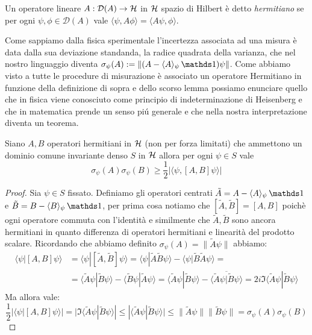 \begin{definition}
    Un operatore lineare $A : \mathcal{D}(A)\to \operatorname{\mathcal{H}}$ in $\operatorname{\mathcal{H}}$ spazio di Hilbert è detto \emph{hermitiano} se per ogni $\psi, \phi \in \mathcal{D}(A)$ vale $\langle \psi, A \phi \rangle = \langle A \psi, \phi \rangle$.
\end{definition}
Come sappiamo dalla fisica sperimentale l'incertezza associata ad una misura è data dalla sua deviazione standanda, la radice quadrata della varianza, che nel nostro linguaggio diventa $\sigma_\psi(A):= \| (A - \langle A \rangle_\psi \un) \psi \|$. Come abbiamo visto a tutte le procedure di misurazione è associato un operatore Hermitiano in funzione della definizione di sopra e dello scorso lemma possiamo enunciare quello che in fisica viene conosciuto come principio di indeterminazione di Heisenberg e che in matematica prende un senso piú generale e che nella nostra interpretazione diventa un teorema. 

\begin{theorem}
    Siano $A,B$ operatori hermitiani in $\operatorname{\mathcal{H}}$ (non per forza limitati) che ammettono un dominio comune invariante denso $S$ in $\operatorname{\mathcal{H}}$ allora per ogni $\psi \in S$ vale $$\sigma_\psi(A) \sigma_\psi(B) \geq \dfrac{1}{2} |\langle \psi, [A,B] \psi \rangle|$$
\end{theorem}

\begin{proof}
    Sia $\psi \in S$ fissato. Definiamo gli operatori centrati $\tilde{A} = A - \langle A \rangle_\psi \un$ e $\tilde{B}= B - \langle B \rangle_\psi \un$, per prima cosa notiamo che $[\tilde{A}, \tilde{B}]= [A,B]$ poichè ogni operatore commuta con l'identità e similmente che $\tilde{A}, \tilde{B}$ sono ancora hermitiani in quanto differenza di operatori hermitiani e linearità del prodotto scalare. Ricordando che abbiamo definito $\sigma_\psi(A)= \| \tilde{A} \psi \|$ abbiamo:
\begin{align*}
\langle \psi | [A,B] \psi \rangle &= \langle \psi | [\tilde{A}, \tilde{B}] \psi \rangle = \langle \psi | \tilde{A} \tilde{B} \psi \rangle - \langle \psi | \tilde{B}\tilde{A} \psi \rangle = \\
 &= \langle \tilde{A} \psi | \tilde{B} \psi \rangle - \langle \tilde{B} \psi | \tilde{A} \psi \rangle = \langle \tilde{A} \psi | \tilde{B} \psi \rangle - \overline{\langle \tilde{A} \psi | \tilde{B} \psi \rangle} = 2i \Im \langle \tilde{A} \psi | \tilde{B} \psi \rangle
\end{align*}
Ma allora vale: 
$$\dfrac{1}{2}| \langle \psi | [A,B] \psi \rangle | = |\Im \langle \tilde{A} \psi | \tilde{B} \psi \rangle | \leq |\langle \tilde{A} \psi | \tilde{B} \psi \rangle | \leq \| \tilde{A} \psi \| \| \tilde{B} \psi \| = \sigma_\psi(A) \sigma_\psi(B)$$
\end{proof}

